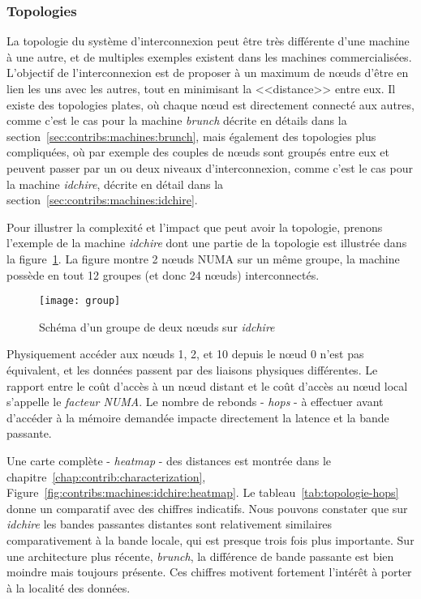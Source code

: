 
\subsubsection{Topologies}

La topologie du système d'interconnexion peut être très différente d'une machine à une autre, et de multiples exemples existent dans les machines commercialisées.
L'objectif de l'interconnexion est de proposer à un maximum de nœuds d'être en lien les uns avec les autres, tout en minimisant la <<distance>> entre eux.
Il existe des topologies plates, où chaque nœud est directement connecté aux autres, comme c'est le cas pour la machine \emph{brunch} décrite en détails dans la section~\ref{sec:contribs:machines:brunch}, mais également des topologies plus compliquées, où par exemple des couples de nœuds sont groupés entre eux et peuvent passer par un ou deux niveaux d'interconnexion, comme c'est le cas pour la machine \emph{idchire}, décrite en détail dans la section~\ref{sec:contribs:machines:idchire}.

Pour illustrer la complexité et l'impact que peut avoir la topologie, prenons l'exemple de la machine \emph{idchire} dont une partie de la topologie est illustrée dans la figure~\ref{fig:context:group-idchire}.
La figure montre 2 nœuds NUMA sur un même groupe, la machine possède en tout 12 groupes (et donc 24 nœuds) interconnectés.

\begin{figure}[ht]
  \centering
  \texttt{[image: group]}
  \caption{Schéma d'un groupe de deux nœuds sur \emph{idchire}}\label{fig:context:group-idchire}
\end{figure}


Physiquement accéder aux nœuds 1, 2, et 10 depuis le nœud 0 n'est pas équivalent, et les données passent par des liaisons physiques différentes.
Le rapport entre le coût d'accès à un nœud distant et le coût d'accès au nœud local s'appelle le \emph{facteur NUMA}.
Le nombre de rebonds - \emph{hops} - à effectuer avant d'accéder à la mémoire demandée impacte directement la latence et la bande passante.

Une carte complète - \emph{heatmap} - des distances est montrée dans le chapitre~\ref{chap:contrib:characterization}, Figure~\ref{fig:contribs:machines:idchire:heatmap}.
Le tableau~\ref{tab:topologie-hops} donne un comparatif avec des chiffres indicatifs. Nous pouvons constater que sur \emph{idchire} les bandes passantes distantes sont relativement similaires comparativement à la bande locale, qui est presque trois fois plus importante.
Sur une architecture plus récente, \emph{brunch}, la différence de bande passante est bien moindre mais toujours présente.
Ces chiffres motivent fortement l'intérêt à porter à la localité des données.


